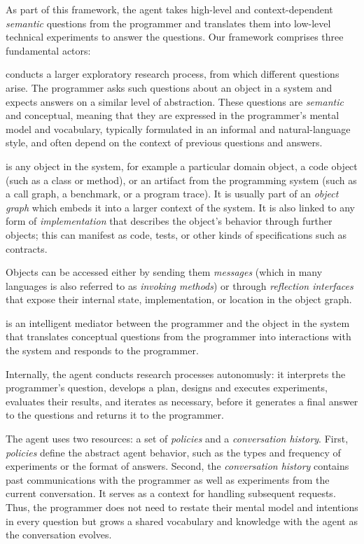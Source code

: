 As part of this framework, the agent takes high-level and context-dependent \emph{semantic} questions from the programmer and translates them into low-level technical experiments to answer the questions.
Our framework comprises three fundamental actors:

\begin{description}[noextralabelsep]
	\item[The programmer] conducts a larger exploratory research process, from which different questions arise.
	The programmer asks such questions about an object in a system and expects answers on a similar level of abstraction.
	These questions are \emph{semantic} and conceptual, meaning that they are expressed in the programmer's mental model and vocabulary, typically formulated in an informal and natural-language style, and often depend on the context of previous questions and answers.

	\item[The object] is any object in the system, for example a particular domain object, a code object (such as a class or method), or an artifact from the programming system (such as a call graph, a benchmark, or a program trace).
	It is usually part of an \emph{object graph} which embeds it into a larger context of the system.
	It is also linked to any form of \emph{implementation} that describes the object's behavior through further objects; this can manifest as code, tests, or other kinds of specifications such as contracts.

	Objects can be accessed either by sending them \emph{messages} (which in many languages is also referred to as \emph{invoking methods}) or through \emph{reflection interfaces} that expose their internal state, implementation, or location in the object graph.

	\item[The exploratory programming agent] is an intelligent mediator between the programmer and the object in the system that translates conceptual questions from the programmer into interactions with the system and responds to the programmer.

	Internally, the agent conducts research processes autonomusly: it interprets the programmer's question, develops a plan, designs and executes experiments, evaluates their results, and iterates as necessary, before it generates a final answer to the questions and returns it to the programmer.

	The agent uses two resources: a set of \emph{policies} and a \emph{conversation history}.
	First, \emph{policies} define the abstract agent behavior, such as the types and frequency of experiments or the format of answers.
	Second, the \emph{conversation history} contains past communications with the programmer as well as experiments from the current conversation.
	It serves as a context for handling subsequent requests.
	Thus, the programmer does not need to restate their mental model and intentions in every question but grows a shared vocabulary and knowledge with the agent as the conversation evolves.
\end{description}

